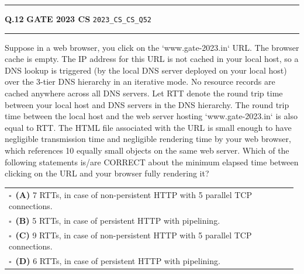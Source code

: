 \documentclass[a4paper,10pt]{article}
\begin{document}
\vspace{6pt}\hrule height 0.35pt\vspace{6pt}
\noindent
\begin{tcolorbox}[
    blanker,
    sidebyside,
    sidebyside align=top,
    lefthand width=0.55\textwidth,
    top=4pt, bottom=4pt, left=0pt, right=0pt,
    middle=16pt,
    underlay={
        \draw[dashed, black!80, line width=0.8pt, dash pattern=on 4pt off 3pt]
            ([xshift=0.55\textwidth+8pt]frame.north west) --
            ([xshift=0.55\textwidth+8pt]frame.south west);
    }
]
\textbf{Q.12}  \hfill {\footnotesize\textbf{GATE 2023 CS} \quad \tiny\texttt{2023\_CS\_CS\_Q52}}
\vspace{2pt}\hrule height 0.3pt\vspace{4pt}

Suppose in a web browser, you click on the `www.gate-2023.in` URL. The browser cache is empty. The IP address for this URL is not cached in your local host, so a DNS lookup is triggered (by the local DNS server deployed on your local host) over the 3-tier DNS hierarchy in an iterative mode. No resource records are cached anywhere across all DNS servers.
Let RTT denote the round trip time between your local host and DNS servers in the DNS hierarchy. The round trip time between the local host and the web server hosting `www.gate-2023.in` is also equal to RTT. The HTML file associated with the URL is small enough to have negligible transmission time and negligible rendering time by your web browser, which references 10 equally small objects on the same web server.
Which of the following statements is/are CORRECT about the minimum elapsed time between clicking on the URL and your browser fully rendering it?

\par\vspace{6pt}\noindent
\begin{tabular}{@{}p{0.98\linewidth}@{}}
$\square$\ \textbf{(A)} 7 RTTs, in case of non-persistent HTTP with 5 parallel TCP connections. \\
\addlinespace[3pt]
$\square$\ \textbf{(B)} 5 RTTs, in case of persistent HTTP with pipelining. \\
\addlinespace[3pt]
$\square$\ \textbf{(C)} 9 RTTs, in case of non-persistent HTTP with 5 parallel TCP connections. \\
\addlinespace[3pt]
$\square$\ \textbf{(D)} 6 RTTs, in case of persistent HTTP with pipelining.
\end{tabular}


\end{tcolorbox}
\end{document}
